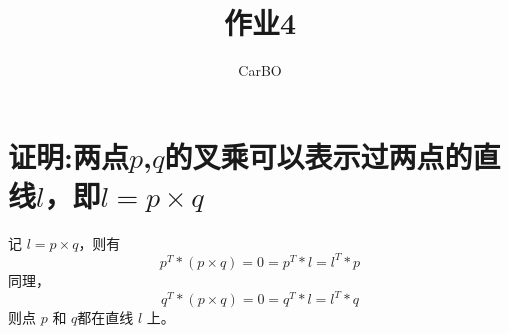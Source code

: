 \documentclass[utf8]{ctexart}
\title{\zihao{2} 作业4}
\author{\zihao{4} CarBO}
\date{}
\begin{document}
\maketitle
    \section{ 证明:两点$p$,$q$的叉乘可以表示过两点的直线$l$，即$l = p \times q$}
    记 $l= p\times q$，则有 $$p^T*(p\times q)=0=p^T*l=l^T*p$$
    同理，$$q^T*(p\times q)=0=q^T*l=l^T*q$$
    则点 $p$ 和 $q$都在直线 $l$ 上。
\end{document}

